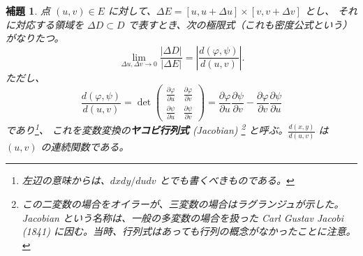 \documentclass[a4paper]{jsarticle}
\newtheorem{Lemma}[Theorem]{補題}
\theoremstyle{definition}
\theoremstyle{remark}
\newcommand{\del}{\partial}
\begin{document}
\begin{Lemma}
点 $(u,v) \in E$ に対して、$\Delta E = [u,u+\Delta u]\times [v,v+\Delta v]$ とし、
それに対応する領域を $\Delta D \subset D$ で表すとき、次の極限式（これも密度公式という）がなりたつ。
\[
\lim_{\Delta u, \Delta v \to 0} \frac{|\Delta D|}{|\Delta E|} 
= \left| \frac{d(\varphi,\psi)}{d(u,v)} \right|.  
\]
ただし、
\[
\frac{d(\varphi,\psi)}{d(u,v)} = 
\det\begin{pmatrix}
\frac{\del\varphi}{\del u} & \frac{\del\varphi}{\del v}\\
\frac{\del\psi}{\del u}& \frac{\del\psi}{\del v}
\end{pmatrix}
= 
\frac{\del\varphi}{\del u} \frac{\del\psi}{\del v} 
- \frac{\del\varphi}{\del v} \frac{\del\psi}{\del u}
\]
であり\footnote{左辺の意味からは、$dxdy/dudv$ とでも書くべきものである。}、
これを変数変換の\textbf{ヤコビ行列式} {\rm (Jacobian)} 
\footnote{
この二変数の場合をオイラーが、三変数の場合はラグランジュが示した。
Jacobian という名称は、一般の多変数の場合を扱った Carl Gustav Jacobi (1841) に因む。当時、行列式はあっても行列の概念がなかったことに注意。}
と呼ぶ。$\frac{d(x,y)}{d(u,v)}$ は $(u,v)$ の連続関数である。
\end{Lemma} 
\end{document}
